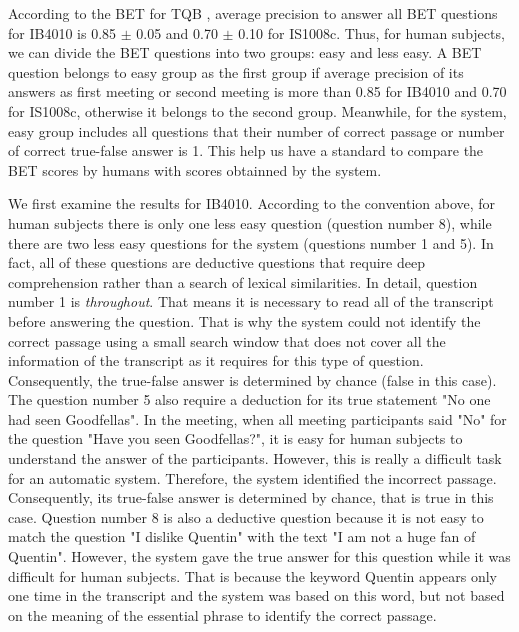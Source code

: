 

According to the BET for TQB \cite{popescubelis2007otm}, average precision to answer all BET questions for IB4010 is 0.85 \ensuremath{\pm} 0.05 and 0.70 \ensuremath{\pm} 0.10 for IS1008c. Thus, for human subjects, we can divide the BET questions into two groups: easy and less easy. A BET question belongs to easy group as the first group if average precision of its answers as first meeting or second meeting is more than 0.85 for IB4010 and 0.70 for IS1008c, otherwise it belongs to the second group. Meanwhile, for the system, easy group includes all questions that  their number of correct passage or number of correct true-false answer is 1.
This help us have a standard to compare the BET scores by humans with scores obtainned by the system.

We first examine the results for IB4010. According to the convention above, for human subjects there is only one less easy question (question number 8), while there are two less easy questions for the system (questions number 1 and 5). In fact, all of these questions are deductive questions that require deep comprehension rather than a search of lexical similarities. In detail, question number 1 is \textit{throughout}. That means it is necessary to read all of the transcript before answering the question. That is why the system could not identify the correct passage using a small search window that does not cover all the information of the transcript as it requires for this type of question. Consequently, the true-false answer is determined by chance (false in this case). The question number 5 also require a deduction for its true statement "No one had seen Goodfellas". In the meeting, when all meeting participants said "No" for the question "Have you seen Goodfellas?", it is easy for human subjects to understand the answer of the participants. However, this is really a difficult task for an automatic system.  Therefore, the system identified the incorrect passage. Consequently, its true-false answer is determined by chance, that is true in this case. Question number 8 is also a deductive question because it is not easy to match the question "I dislike Quentin" with the text "I am not a huge fan of Quentin". However, the system gave the true answer for this question while it was difficult for human subjects. That is because the keyword Quentin appears only one time in the transcript and the system was based on this word, but not based on the meaning of the essential phrase to identify the correct passage.

